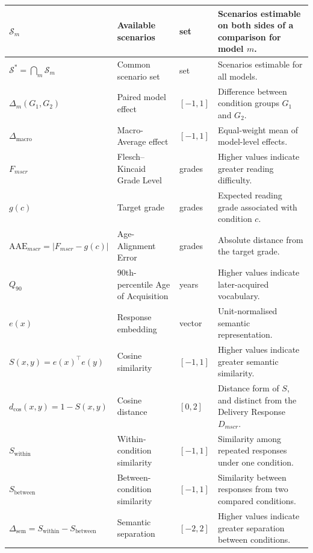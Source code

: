 \begin{longtable*}{|
>{\centering\arraybackslash}p{2.7cm}|
>{\raggedright\arraybackslash}p{4.4cm}|
>{\centering\arraybackslash}p{1.8cm}|
>{\raggedright\arraybackslash}p{5.5cm}|
}
$\mathcal{S}_m$ &
Available scenarios &
set &
Scenarios estimable on both sides of a comparison for model $m$. \\
\hline

$\mathcal{S}^{*}=\bigcap_m \mathcal{S}_m$ &
Common scenario set &
set &
Scenarios estimable for all models. \\
\hline

$\Delta_m(G_1,G_2)$ &
Paired model effect &
$[-1,1]$ &
Difference between condition groups $G_1$ and $G_2$. \\
\hline

$\Delta_{\mathrm{macro}}$ &
Macro-Average effect &
$[-1,1]$ &
Equal-weight mean of model-level effects. \\
\hline


$F_{mscr}$ &
Flesch--Kincaid Grade Level &
grades &
Higher values indicate greater reading difficulty. \\
\hline

$g(c)$ &
Target grade &
grades &
Expected reading grade associated with condition $c$. \\
\hline

$\mathrm{AAE}_{mscr}=|F_{mscr}-g(c)|$ &
Age-Alignment Error &
grades &
Absolute distance from the target grade. \\
\hline

$Q_{90}$ &
90th-percentile Age of Acquisition &
years &
Higher values indicate later-acquired vocabulary. \\
\hline


$e(x)$ &
Response embedding &
vector &
Unit-normalised semantic representation. \\
\hline

$S(x,y)=e(x)^\top e(y)$ &
Cosine similarity &
$[-1,1]$ &
Higher values indicate greater semantic similarity. \\
\hline

$d_{\cos}(x,y)=1-S(x,y)$ &
Cosine distance &
$[0,2]$ &
Distance form of $S$, and distinct from the Delivery Response $D_{mscr}$. \\
\hline

$S_{\mathrm{within}}$ &
Within-condition similarity &
$[-1,1]$ &
Similarity among repeated responses under one condition. \\
\hline

$S_{\mathrm{between}}$ &
Between-condition similarity &
$[-1,1]$ &
Similarity between responses from two compared conditions. \\
\hline

$\Delta_{\mathrm{sem}}
= S_{\mathrm{within}}-S_{\mathrm{between}}$ &
Semantic separation &
$[-2,2]$ &
Higher values indicate greater separation between conditions. \\
\hline


\end{longtable*}
